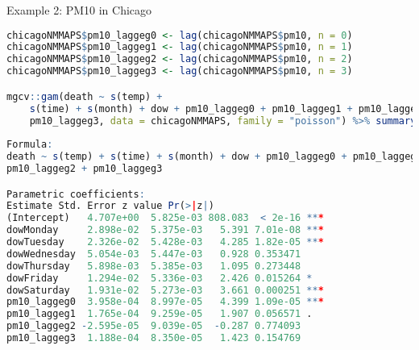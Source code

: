 \documentclass{beamer}
\begin{document}


\begin{frame}[fragile]{Example 2: PM10 in Chicago}
	\begin{lstlisting}[language=R, basicstyle=\tiny]
chicagoNMMAPS$pm10_laggeg0 <- lag(chicagoNMMAPS$pm10, n = 0)
chicagoNMMAPS$pm10_laggeg1 <- lag(chicagoNMMAPS$pm10, n = 1)
chicagoNMMAPS$pm10_laggeg2 <- lag(chicagoNMMAPS$pm10, n = 2)
chicagoNMMAPS$pm10_laggeg3 <- lag(chicagoNMMAPS$pm10, n = 3)

mgcv::gam(death ~ s(temp) + 
	s(time) + s(month) + dow + pm10_laggeg0 + pm10_laggeg1 + pm10_laggeg2 +
	pm10_laggeg3, data = chicagoNMMAPS, family = "poisson") %>% summary()
	
Formula:
death ~ s(temp) + s(time) + s(month) + dow + pm10_laggeg0 + pm10_laggeg1 + 
pm10_laggeg2 + pm10_laggeg3

Parametric coefficients:
Estimate Std. Error z value Pr(>|z|)    
(Intercept)   4.707e+00  5.825e-03 808.083  < 2e-16 ***
dowMonday     2.898e-02  5.375e-03   5.391 7.01e-08 ***
dowTuesday    2.326e-02  5.428e-03   4.285 1.82e-05 ***
dowWednesday  5.054e-03  5.447e-03   0.928 0.353471    
dowThursday   5.898e-03  5.385e-03   1.095 0.273448    
dowFriday     1.294e-02  5.336e-03   2.426 0.015264 *  
dowSaturday   1.931e-02  5.273e-03   3.661 0.000251 ***
pm10_laggeg0  3.958e-04  8.997e-05   4.399 1.09e-05 ***
pm10_laggeg1  1.765e-04  9.259e-05   1.907 0.056571 .  
pm10_laggeg2 -2.595e-05  9.039e-05  -0.287 0.774093    
pm10_laggeg3  1.188e-04  8.350e-05   1.423 0.154769   
	\end{lstlisting}
\end{frame}
\end{document}
